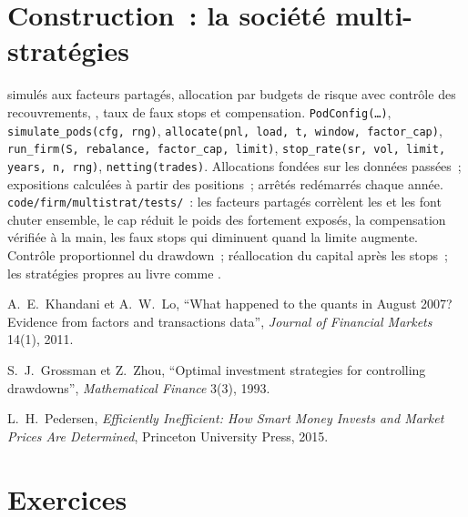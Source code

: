 \section{Construction~: la société multi-stratégies}\label{bld:s1:running-a-multi-strategy-book:multistrat}

\begin{build}
  simulés aux facteurs partagés, allocation par budgets de risque avec contrôle des recouvrements, , taux de faux stops et compensation.
 \texttt{PodConfig(\dots)}, \texttt{simulate\_pods(cfg, rng)}, \texttt{allocate(pnl, load, t, window, factor\_cap)},
\texttt{run\_firm(S, rebalance, factor\_cap, limit)}, \texttt{stop\_rate(sr, vol, limit, years, n, rng)}, \texttt{netting(trades)}.
 Allocations fondées sur les données passées~; expositions calculées à partir des positions~;  arrêtés redémarrés chaque année.
 \texttt{code/firm/multistrat/tests/}~: les facteurs partagés corrèlent les  et les font chuter ensemble, le cap réduit le poids des 
fortement exposés, la compensation vérifiée à la main, les faux stops qui diminuent quand la limite augmente.
 Contrôle proportionnel du drawdown~; réallocation du capital après les stops~; les stratégies propres au livre comme .
\end{build}

\begin{omsources}
\item A.~E.~Khandani et A.~W.~Lo, ``What happened to the quants in August 2007? Evidence from factors and transactions data'', \emph{Journal of
Financial Markets} 14(1), 2011.
\item S.~J.~Grossman et Z.~Zhou, ``Optimal investment strategies for controlling drawdowns'', \emph{Mathematical Finance} 3(3), 1993.
\item L.~H.~Pedersen, \emph{Efficiently Inefficient: How Smart Money Invests and Market Prices Are Determined}, Princeton University Press, 2015.
\end{omsources}

\section{Exercices}

